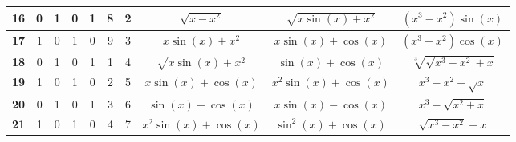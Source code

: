 \documentclass[a4paper,final,12pt]{article}
\begin{document}
\begin{center}
\begin{tabular}{|c|c|c|c|c|c|c|c|c|c|}
	\hline \bf16 & 0 & 1 & 0 & 1 & 8 & 2 & $\sqrt{x-x^{2}}$ & $\sqrt{x \sin (x)+x^{2}}$ & $\left(x^{3}-x^{2}\right) \sin (x)$ 			\\[6pt]
	\hline \bf17 & 1 & 0 & 1 & 0 & 9 & 3 & $x \sin (x)+x^{2}$ & $x \sin (x)+\cos (x)$ & $\left(x^{3}-x^{2}\right) \cos (x)$ 			\\[6pt]
	\hline \bf18 & 0 & 1 & 0 & 1 & 1 & 4 & $\sqrt{x \sin (x)+x^{2}}$ & $\sin (x)+\cos (x)$ & $\sqrt[3]{\!\!\sqrt{x^{3}-x^{2}}+x}$ 		\\[6pt]
	\hline \bf19 & 1 & 0 & 1 & 0 & 2 & 5 & $x \sin (x)+\cos (x)$ & $x^{2} \sin (x)+\cos (x)$ & $x^{3}-x^{2}+\sqrt{x}$ 					\\[6pt]
	\hline \bf20 & 0 & 1 & 0 & 1 & 3 & 6 & $\sin (x)+\cos (x)$ & $x \sin (x)-\cos (x)$ & $x^{3}-\sqrt{x^{2}+x}$ 						\\[6pt]
	\hline \bf21 & 1 & 0 & 1 & 0 & 4 & 7 & $x^{2} \sin (x)+\cos (x)$ & $\sin ^{2}(x)+\cos (x)$ & $\sqrt{x^{3}-x^{2}}+x$ 				\\[6pt]			
	\hline
\end{tabular}
\end{center}
\end{document}
